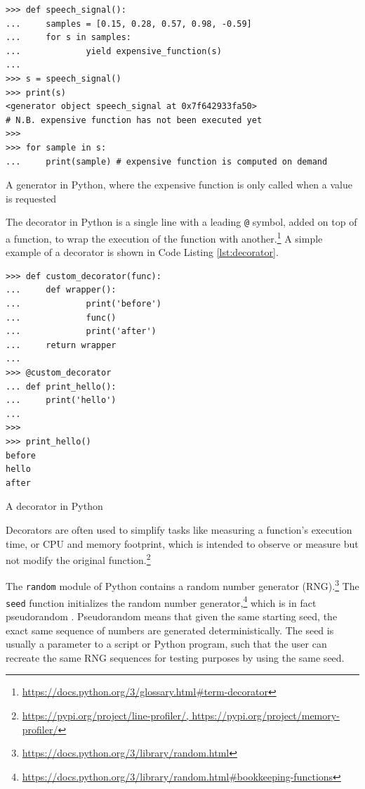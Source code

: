 \documentclass[report.tex]{subfiles}
\begin{document}
\begin{listing}[ht]
\centering
\begin{BVerbatim}
>>> def speech_signal():
...     samples = [0.15, 0.28, 0.57, 0.98, -0.59]
...     for s in samples:
...             yield expensive_function(s)
...
>>> s = speech_signal()
>>> print(s)
<generator object speech_signal at 0x7f642933fa50>
# N.B. expensive function has not been executed yet
>>>
>>> for sample in s:
...     print(sample) # expensive function is computed on demand
\end{BVerbatim}
	\caption{A generator in Python, where the expensive function is only called when a value is requested}
	\label{lst:siggen}
\end{listing}

The decorator in Python is a single line with a leading \Verb#@# symbol, added on top of a function, to wrap the execution of the function with another.\footnote{\url{https://docs.python.org/3/glossary.html\#term-decorator}} A simple example of a decorator is shown in Code Listing \ref{lst:decorator}.

\begin{listing}[ht]
\centering
\begin{BVerbatim}
>>> def custom_decorator(func):
...     def wrapper():
...             print('before')
...             func()
...             print('after')
...     return wrapper
...
>>> @custom_decorator
... def print_hello():
...     print('hello')
...
>>>
>>> print_hello()
before
hello
after
\end{BVerbatim}
	\caption{A decorator in Python}
	\label{lst:decorator}
\end{listing}

Decorators are often used to simplify tasks like measuring a function's execution time, or CPU and memory footprint, which is intended to observe or measure but not modify the original function.\footnote{\url{https://pypi.org/project/line-profiler/, https://pypi.org/project/memory-profiler/}}

The \Verb#random# module of Python contains a random number generator (RNG).\footnote{\url{https://docs.python.org/3/library/random.html}} The \Verb#seed# function initializes the random number generator,\footnote{\url{https://docs.python.org/3/library/random.html\#bookkeeping-functions}} which is in fact pseudorandom \parencite{pseudorng}. Pseudorandom means that given the same starting seed, the exact same sequence of numbers are generated deterministically. The seed is usually a parameter to a script or Python program, such that the user can recreate the same RNG sequences for testing purposes by using the same seed.
\end{document}

